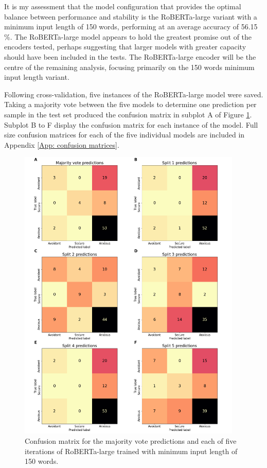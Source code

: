 \documentclass[12pt]{report}
\begin{document}
It is my assessment that the model configuration that provides the optimal balance between performance and stability is the RoBERTa-large variant with a minimum input length of 150 words, performing at an average accuracy of 56.15 \%.
The RoBERTa-large model appears to hold the greatest promise out of the encoders tested, perhaps suggesting that larger models with greater capacity should have been included in the tests.
The RoBERTa-large encoder will be the centre of the remaining analysis, focusing primarily on the 150 words minimum input length variant.

Following cross-validation, five instances of the RoBERTa-large model were saved.
Taking a majority vote between the five models to determine one prediction per sample in the test set produced the confusion matrix in subplot A of Figure \ref{fig: all confusion matrices}.
Subplot B to F display the confusion matrix for each instance of the model.
Full size confusion matrices for each of the five individual models are included in Appendix \ref{App: confusion matrices}.

\begin{figure}
    \includegraphics[width=0.95\textwidth]{figures/combined_confusion_matrix.png}
    \caption{Confusion matrix for the majority vote predictions and each of five iterations of RoBERTa-large trained with minimum input length of 150 words.}
    \label{fig: all confusion matrices}
\end{figure}
\end{document}
